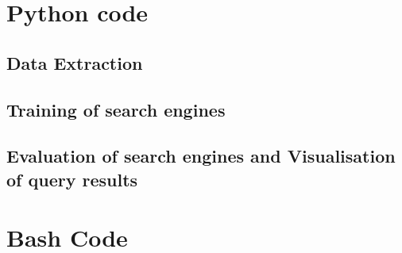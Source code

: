 \documentclass [14 pt]{article}
\begin{document}
\newpage
\appendix

\section{Python code}

\subsection{Data Extraction}

\subsection{Training of search engines}

\subsection{Evaluation of search engines and Visualisation of query results}



\section{Bash Code} 

\end{document}
